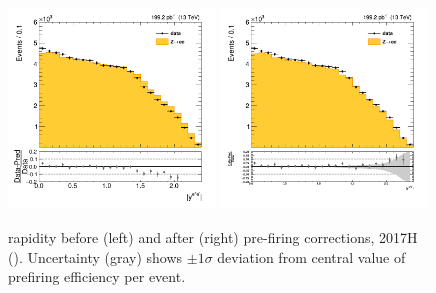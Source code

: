 \begin{figure}[htb]
\includegraphics[width=0.49\textwidth]{plots/Prefire/Zee13_Zrap_noPrefire.png}
\includegraphics[width=0.49\textwidth]{plots/Prefire/Zee13_Zrap_inclPrefire.png}
\caption{\zee rapidity before (left) and after (right) pre-firing corrections, 2017H (\sh). Uncertainty (gray) shows $\pm 1 \sigma$ deviation from central value of prefiring efficiency per event.}
\label{fig:prefire:zrap:2017H}
\end{figure}